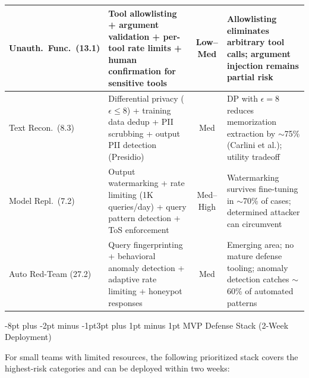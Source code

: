 \documentclass[conference]{IEEEtran}
\makeatletter
\renewcommand{\subsection}{\@startsection{subsection}{2}{\z@}%
  {-8pt plus -2pt minus -1pt}{3pt plus 1pt minus 1pt}%
  {\normalfont\normalsize\bfseries\sffamily\color{accentblue}}}
\makeatother
\begin{document}
\begin{table}[!htbp]
\begin{tabular}{p{1.8cm}p{4.5cm}cp{4.5cm}}
\midrule
Unauth.\ Func.\ (13.1) & Tool allowlisting + argument validation + per-tool rate limits + human confirmation for sensitive tools & Low--Med & Allowlisting eliminates arbitrary tool calls; argument injection remains partial risk \\
\midrule
Text Recon.\ (8.3) & Differential privacy ($\epsilon \leq 8$) + training data dedup + PII scrubbing + output PII detection (Presidio) & Med & DP with $\epsilon{=}8$ reduces memorization extraction by $\sim$75\% (Carlini et al.); utility tradeoff \\
\midrule
Model Repl.\ (7.2) & Output watermarking + rate limiting (1K queries/day) + query pattern detection + ToS enforcement & Med--High & Watermarking survives fine-tuning in $\sim$70\% of cases; determined attacker can circumvent \\
\midrule
Auto Red-Team (27.2) & Query fingerprinting + behavioral anomaly detection + adaptive rate limiting + honeypot responses & Med & Emerging area; no mature defense tooling; anomaly detection catches $\sim$60\% of automated patterns \\
\bottomrule
\end{tabular}
\end{table}

\subsection{MVP Defense Stack (2-Week Deployment)}

For small teams with limited resources, the following prioritized stack covers the highest-risk categories and can be deployed within two weeks:
\end{document}
